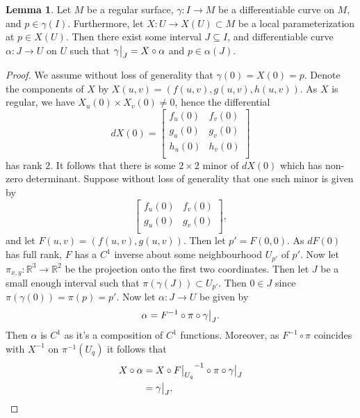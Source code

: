\documentclass{article}
\newcommand\restr[2]{{%
  \left.\kern-\nulldelimiterspace %
  #1 %
  \vphantom{\big|} %
  \right|_{#2} %
  }}
\theoremstyle{definition}
\newtheorem{lemma}[theorem]{Lemma}
\newcommand{\R}{\mathbb{R}}
\begin{document}
\begin{lemma}
	Let $M$ be a regular surface, $\gamma : I \to M$ be a differentiable curve
	on $M$, and $p \in \gamma(I)$. Furthermore, let $X : U \to X(U) \subset M$
	be a local parameterization at $p \in X(U)$. Then there exist some interval
	$J \subseteq I$, and differentiable curve $\alpha : J \to U$ on $U$ such
	that $\restr{\gamma}{J} = X \circ \alpha$ and $p \in \alpha(J)$.
\end{lemma}
\begin{proof}
	We assume without loss of generality that $\gamma(0) = X(0) = p$. Denote
	the components of $X$ by $X(u, v) = (f(u, v), g(u, v), h(u, v))$. As $X$ is
	regular, we have $X_u(0) \times X_v(0) \not = 0$, hence the differential 	
	\[
		dX(0)
		=
		\begin{bmatrix}
			f_u(0) & f_v(0) \\
			g_u(0) & g_v(0) \\
			h_u(0) & h_v(0) \\
		\end{bmatrix}
	\] 
	has rank $2$. It follows that there is some $2 \times 2$ minor of $dX(0)$
	which has non-zero determinant. Suppose without loss of generality that one
	such minor is given by
	\[
		\begin{bmatrix}
			f_u(0) & f_v(0) \\
			g_u(0) & g_v(0) \\
		\end{bmatrix},
	\]
	and let $F(u, v) = (f(u, v), g(u, v))$. Then let $p' = F(0, 0)$. As $dF(0)$
	has full rank, $F$ has a $C^{1}$ inverse about some neighbourhood $U_{p'}$ of
	$p'$. Now let $\pi_{x, y} : \R^{3} \to \R^{2}$ be the projection onto the
	first two coordinates. Then let $J$ be a small enough interval such that
	$\pi(\gamma(J)) \subset U_{p'}$. Then $0 \in J$ since $\pi(\gamma(0)) =
	\pi(p) = p'$. Now let $\alpha : J \to U$ be given by 
	\[
		\alpha
		=
		F^{-1}
		\circ 
		\pi
		\circ
		\restr{\gamma}{J}.
	\] 
	Then $\alpha$ is $C^1$ as it's a composition of $C^1$ functions. Moreover,
	as $F^{-1} \circ \pi$ coincides with $X^{-1}$ on $\pi^{-1}(U_q)$ it follows
	that
	\begin{align*}
		X \circ \alpha
		&=
		X
		\circ
		\restr{F}{U_q}^{-1}
		\circ 
		\pi
		\circ
		\restr{\gamma}{J} \\
		&=
		\restr{\gamma}{J}.
	\end{align*}
\end{proof}
\end{document}
